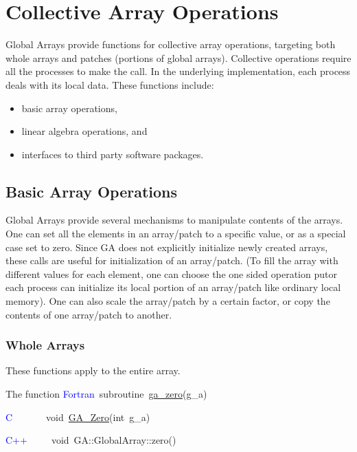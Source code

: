 \chapter{Collective Array Operations}

Global Arrays provide functions for collective array operations, targeting
both whole arrays and patches (portions of global arrays). Collective
operations require all the processes to make the call. In the underlying
implementation, each process deals with its local data. These functions
include:
\begin{itemize}
\item basic array operations, 
\item linear algebra operations, and 
\item interfaces to third party software packages.
\end{itemize}

\section{Basic Array Operations }

Global Arrays provide several mechanisms to manipulate contents of
the arrays. One can set all the elements in an array/patch to a specific
value, or as a special case set to zero. Since GA does not explicitly
initialize newly created arrays, these calls are useful for initialization
of an array/patch. (To fill the array with different values for each
element, one can choose the one sided operation putor each process
can initialize its local portion of an array/patch like ordinary local
memory). One can also scale the array/patch by a certain factor, or
copy the contents of one array/patch to another. 


\subsection{Whole Arrays }

These functions apply to the entire array.

The function
\textcolor{blue}{Fortran}~subroutine~\href{http://www.emsl.pnl.gov/docs/global/ga_ops.html\#ga_zero}{ga\_{}zero}(g\_a)~

\textcolor{blue}{C}~~~~~~~void~\href{http://www.emsl.pnl.gov/docs/global/c_nga_ops.html\#ga_zero}{GA\_{}Zero}(int~g\_a)~

\textcolor{blue}{C++}~~~~~void~GA::GlobalArray::zero()

